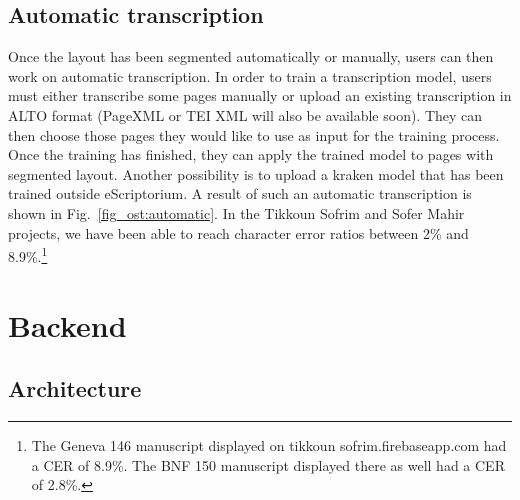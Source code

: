 \subsection{Automatic transcription}

Once the layout has been segmented automatically or manually, users can then
work on automatic transcription. In order to train a transcription model, users
must either transcribe some pages manually or upload an existing transcription
in ALTO format (PageXML or TEI XML will also be available soon). They can then
choose those pages they would like to use as input for the training process.
Once the training has finished, they can apply the trained model to pages with
segmented layout. Another possibility is to upload a kraken model that has been
trained outside eScriptorium. A result of such an automatic transcription is
shown in Fig.~\ref{fig_ost:automatic}. In the Tikkoun Sofrim and Sofer Mahir projects, we have been
able to reach character error ratios between 2\% and 8.9\%.\footnote{The Geneva
146 manuscript displayed on tikkoun sofrim.firebaseapp.com had a CER of 8.9\%.
The BNF 150 manuscript displayed there as well had a CER of 2.8\%.}

\section{Backend}

\subsection{Architecture}

